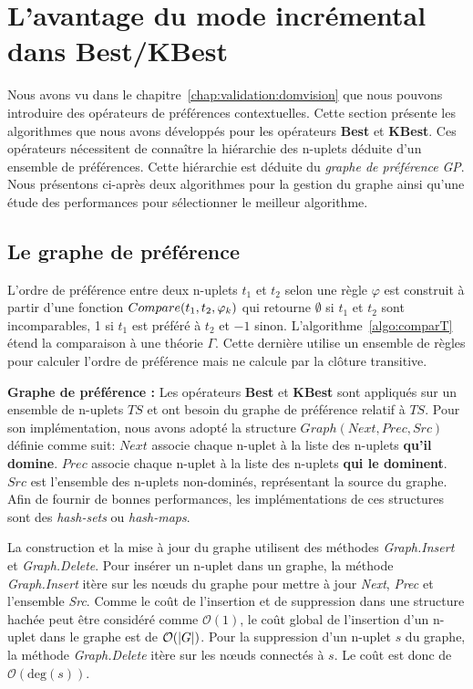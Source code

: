 \section{L'avantage du mode incrémental dans Best/KBest}\label{sec:valid:perfs:prefs}
Nous avons vu dans le chapitre~\ref{chap:validation:domvision} que nous pouvons introduire des opérateurs de préférences contextuelles. Cette section présente les algorithmes que nous avons développés pour les opérateurs \textbf{Best} et \textbf{KBest}. Ces opérateurs nécessitent de connaître la hiérarchie des n-uplets déduite d'un ensemble de préférences. Cette hiérarchie est déduite du \textit{graphe de préférence} \textit{GP}. Nous présentons ci-après deux algorithmes pour la gestion du graphe ainsi qu'une étude des performances pour sélectionner le meilleur algorithme.

\subsection{Le graphe de préférence}
L'ordre de préférence entre deux n-uplets $t_1$ et $t_2$ selon une règle $\varphi$ est construit à partir d'une fonction $Com\-pare(t_1,t_2,\varphi_k)$ qui retourne $\emptyset$ si $t_1$ et $t_2$ sont incomparables, 1 si $t_1$ est préféré à $t_2$ et $-1$ sinon. L'algorithme~\ref{algo:comparT} étend la comparaison à une théorie $\Gamma$. Cette dernière utilise un ensemble de règles pour calculer l'ordre de préférence mais ne calcule par la clôture transitive.

\textbf{Graphe de préférence : }
Les opérateurs \textbf{Best} et \textbf{KBest} sont appliqués sur un ensemble de n-uplets $TS$ et ont besoin du graphe de préférence relatif à $TS$.
Pour son implémentation, nous avons adopté la structure $Graph(Next, Prec, Src)$ définie comme suit:
 $Next$ associe chaque n-uplet à la liste des n-uplets \textbf{qu'il domine}.
 $Prec$ associe chaque n-uplet à la liste des n-uplets \textbf{qui le dominent}.
 $Src$ est l'ensemble des n-uplets non-dominés, représentant la source du graphe.
Afin de fournir de bonnes performances, les implémentations de ces structures sont des \textit{hash-sets} ou \textit{hash-maps}.

La construction et la mise à jour du graphe utilisent des méthodes \textit{Graph.Insert} et \textit{Graph.Delete}. Pour insérer un n-uplet dans un graphe, la méthode \textit{Graph.Insert} itère sur les nœuds du graphe pour mettre à jour \textit{Next}, \textit{Prec} et l'ensemble \textit{Src}. Comme le coût de l'insertion et de suppression dans une structure hachée peut être considéré comme $\mathcal O(1)$, le coût global de l'insertion d'un n-uplet dans le graphe est de $\mathcal O(\left| G \right|)$. Pour la suppression d'un n-uplet $s$ du graphe, la méthode \textit{Graph.Delete} itère sur les nœuds connectés à $s$. Le coût est donc de $\mathcal O(\mathrm{deg}(s))$.

